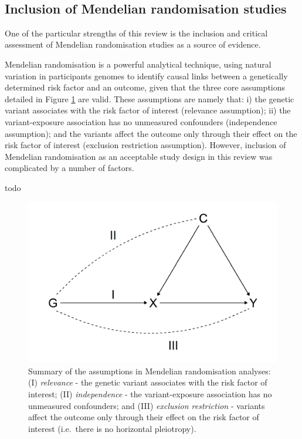 \documentclass[a4paper, twoside]{templates/ociamthesis}
\begin{document}
~

\hypertarget{rev-discussion-MR}{%
\subsection{Inclusion of Mendelian randomisation studies}\label{rev-discussion-MR}}

One of the particular strengths of this review is the inclusion and critical assessment of Mendelian randomisation studies as a source of evidence.

Mendelian randomisation is a powerful analytical technique, using natural variation in participants genomes to identify causal links between a genetically determined risk factor and an outcome, given that the three core assumptions detailed in Figure \ref{fig:mrAssumptions} are valid. These assumptions are namely that: i) the genetic variant associates with the risk factor of interest (relevance assumption); ii) the variant-exposure association has no unmeasured confounders (independence assumption); and the variants affect the outcome only through their effect on the risk factor of interest (exclusion restriction assumption). However, inclusion of Mendelian randomisation as an acceptable study design in this review was complicated by a number of factors.

todo





\begin{figure}[H]

{\centering \includegraphics[width=0.7\linewidth]{figures/sys-rev/mrAssumptions} 

}

\caption[Overview of assumptions in Mendelian randomisation analyses]{Summary of the assumptions in Mendelian randomisation analyses: (I) \emph{relevance} - the genetic variant associates with the risk factor of interest; (II) \emph{independence} - the variant-exposure association has no unmeasured confounders; and (III) \emph{exclusion restriction} - variants affect the outcome only through their effect on the risk factor of interest (i.e.~there is no horizontal pleiotropy).}\label{fig:mrAssumptions}
\end{figure}
\end{document}
